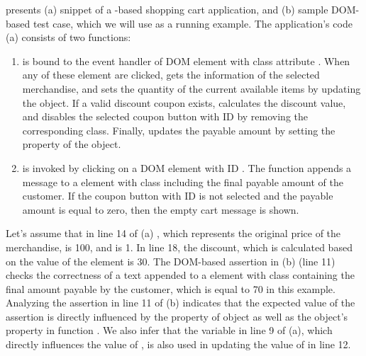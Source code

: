  presents (a) snippet of a \javascript-based shopping cart application, and (b) sample DOM-based \selenium test case, which  we will use as a running example. The application's code (a) consists of two functions:
\begin{enumerate}

\item {} is bound to the event handler of DOM element with class attribute . When any of these element are clicked,  gets the information of the selected merchandise, and sets the quantity of the current available items by updating the  object. If a valid discount coupon exists,  calculates the discount value, and disables the selected  coupon button with ID  by removing the corresponding class. 
Finally,  updates the payable amount by setting the  property of the  object.

\item {} is invoked by clicking on a DOM element with ID . The function appends a message to a  element with class  including the final payable amount of the customer. If the  coupon button with ID  is not selected and the payable amount is equal to zero, then the empty cart message is shown.    

\end{enumerate}
Let's assume that in line 14 of (a) , which represents the original price of the merchandise, is 100, and  is 1. In line 18, the discount, which is calculated based on the  value of the  element is 30. 
The DOM-based assertion in (b) (line 11) checks the correctness of a text appended to a  element with class  containing the final amount payable by the customer, which is equal to 70 in this example.
Analyzing the assertion in line 11 of (b) indicates that the expected value of the assertion is directly influenced by the  property of  object as well as the object's property  in function . We also infer that the  variable in line 9 of (a), which directly influences the value of , is also used in updating the value of  in line 12.

